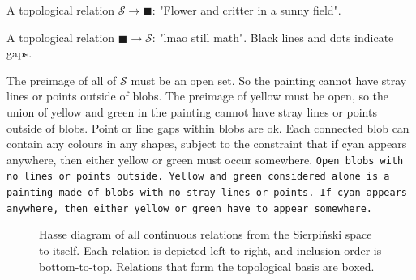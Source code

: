 \documentclass{tufte-handout}
\theoremstyle{definition}
\begin{document}
\begin{marginfigure}
\centering
{}
\caption{A topological relation $\mathcal{S} \rightarrow \blacksquare$: "Flower and critter in a sunny field".}
\label{fig:flower}
\end{marginfigure}

\begin{marginfigure}
\centering
{}
\caption{A topological relation $\blacksquare \rightarrow \mathcal{S}$: "lmao still math". Black lines and dots indicate gaps.}
\label{fig:shitpost}
\end{marginfigure}

 The preimage of all of $\mathcal{S}$ must be an open set. So the painting cannot have stray lines or points outside of blobs. The preimage of yellow must be open, so the union of yellow and green in the painting cannot have stray lines or points outside of blobs. Point or line gaps within blobs are ok. Each connected blob can contain any colours in any shapes, subject to the constraint that if cyan appears anywhere, then either yellow or green must occur somewhere. \texttt{Open blobs with no lines or points outside. Yellow and green considered alone is a painting made of blobs with no stray lines or points. If cyan appears anywhere, then either yellow or green have to appear somewhere.}


\begin{figure}\label{fig:hassesierpinski}
\caption{Hasse diagram of all continuous relations from the Sierpi\'{n}ski space to itself. Each relation is depicted left to right, and inclusion order is bottom-to-top. Relations that form the topological basis are boxed.}
\end{figure}

\clearpage
\end{document}
